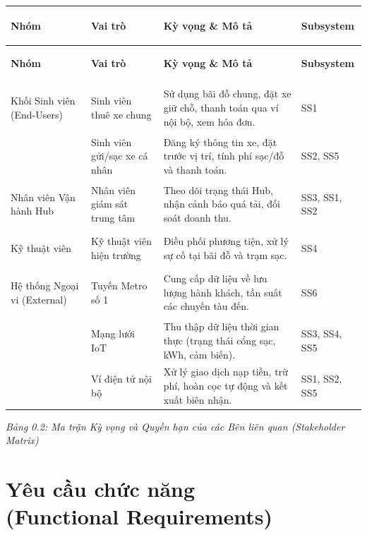 \documentclass[12pt,a4paper]{report}
\begin{document}
\renewcommand{\arraystretch}{1.5}
\begin{longtable}{|>{\bfseries\raggedright}p{2.5cm}|>{\raggedright\arraybackslash}p{3.5cm}|>{\raggedright\arraybackslash}p{6.5cm}|>{\raggedright\arraybackslash}p{2cm}|}
    \hline
    \textbf{Nhóm} & \textbf{Vai trò} & \textbf{Kỳ vọng \& Mô tả} & \textbf{Subsystem} \\
    \hline
    \endfirsthead
    \hline
    \textbf{Nhóm} & \textbf{Vai trò} & \textbf{Kỳ vọng \& Mô tả} & \textbf{Subsystem} \\
    \hline
    \endhead

    Khối Sinh viên (End-Users) & Sinh viên thuê xe chung & Sử dụng bãi đỗ chung, đặt xe giữ chỗ, thanh toán qua ví nội bộ, xem hóa đơn. & SS1 \\
    \hline
    & Sinh viên gửi/sạc xe cá nhân & Đăng ký thông tin xe, đặt trước vị trí, tính phí sạc/đỗ và thanh toán. & SS2, SS5 \\
    \hline
    Nhân viên Vận hành Hub & Nhân viên giám sát trung tâm & Theo dõi trạng thái Hub, nhận cảnh báo quá tải, đối soát doanh thu. & SS3, SS1, SS2 \\
    \hline
    Kỹ thuật viên & Kỹ thuật viên hiện trường & Điều phối phương tiện, xử lý sự cố tại bãi đỗ và trạm sạc. & SS4 \\
    \hline
    Hệ thống Ngoại vi (External) & Tuyến Metro số 1 & Cung cấp dữ liệu về lưu lượng hành khách, tần suất các chuyến tàu đến. & SS6 \\
    \hline
    & Mạng lưới IoT & Thu thập dữ liệu thời gian thực (trạng thái cổng sạc, kWh, cảm biến). & SS3, SS4, SS5 \\
    \hline
    & Ví điện tử nội bộ & Xử lý giao dịch nạp tiền, trừ phí, hoàn cọc tự động và kết xuất biên nhận. & SS1, SS2, SS5 \\
    \hline
\end{longtable}
\begin{center}\textit{Bảng 0.2: Ma trận Kỳ vọng và Quyền hạn của các Bên liên quan (Stakeholder Matrix)}\end{center}
\vspace{0.5cm}
{\let\clearpage\relax
\chapter[Yêu cầu chức năng (Functional Requirements)]{Yêu cầu chức năng \\ (Functional Requirements)}}
\end{document}
